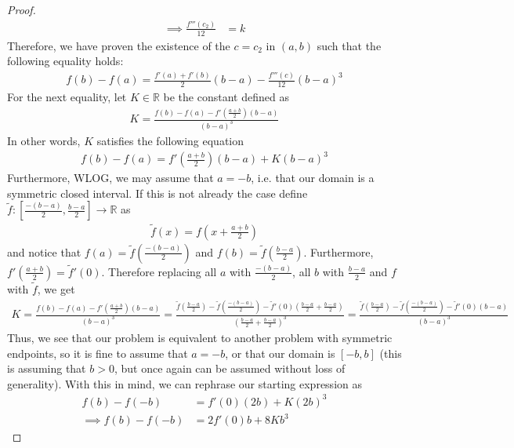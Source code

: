 \documentclass[10pt,a4paper]{article}
\theoremstyle{definition}
\theoremstyle{definition}
\numberwithin{equation}{section}
\begin{document}
\begin{proof}
\begin{align*}
\implies \frac{f'''(c_2)}{12} &= k
\end{align*}
Therefore, we have proven the existence of the $c = c_2$ in $(a, b)$ such that the following equality holds:
\begin{align*}
f(b) - f(a) = \frac{f'(a) + f'(b)}{2}(b - a) - \frac{f'''(c)}{12}(b - a)^3
\end{align*}
For the next equality, let $K \in \mathbb{R}$ be the constant defined as
\begin{align*}
K = \frac{f(b) - f(a) - f'\left(\frac{a + b}{2}\right)(b - a)}{(b - a)^3}
\end{align*}
In other words, $K$ satisfies the following equation
\begin{align*}
f(b) - f(a) = f'\left(\frac{a + b}{2}\right)(b - a) + K(b - a)^3
\end{align*}
Furthermore, WLOG, we may assume that $a = -b$, i.e. that our domain is a symmetric closed interval. If this is not already the case define $\tilde{f}: \left[\frac{-(b - a)}{2}, \frac{b - a}{2}\right] \to \mathbb{R}$ as
\begin{align*}
\tilde{f}(x) = f\left(x + \frac{a + b}{2}\right)
\end{align*}
and notice that $f(a) = \tilde{f}\left(\frac{-(b-a)}{2}\right)$ and $f(b) = \tilde{f}\left(\frac{b - a}{2}\right)$. Furthermore, $f'\left(\frac{a + b}{2}\right) = \tilde{f}'(0)$. Therefore replacing all $a$ with $\frac{-(b - a)}{2}$, all $b$ with $\frac{b - a}{2}$ and $f$ with $\tilde{f}$, we get
\begin{align*}
K = \frac{f(b) - f(a) - f'\left(\frac{a + b}{2}\right)(b - a)}{(b - a)^3} = \frac{\tilde{f}\left(\frac{b - a}{2}\right) - \tilde{f}\left(\frac{-(b - a)}{2}\right) - \tilde{f}'\left(0\right)\left(\frac{b - a}{2} + \frac{b -a}{2}\right)}{\left(\frac{b - a}{2} + \frac{b -a}{2}\right)^3} = \frac{\tilde{f}\left(\frac{b - a}{2}\right) - \tilde{f}\left(\frac{-(b - a)}{2}\right) - \tilde{f}'\left(0\right)\left(b - a\right)}{\left(b - a\right)^3}
\end{align*}
Thus, we see that our problem is equivalent to another problem with symmetric endpoints, so it is fine to assume that $a = -b$, or that our domain is $[-b, b]$ (this is assuming that $b > 0$, but once again can be assumed without loss of generality). With this in mind, we can rephrase our starting expression as
\begin{align*}
f(b) - f(-b) &= f'(0)(2b) + K(2b)^3\\
\implies f(b) - f(-b) &= 2f'(0)b + 8Kb^3
\end{align*}

\end{proof}
\end{document}
